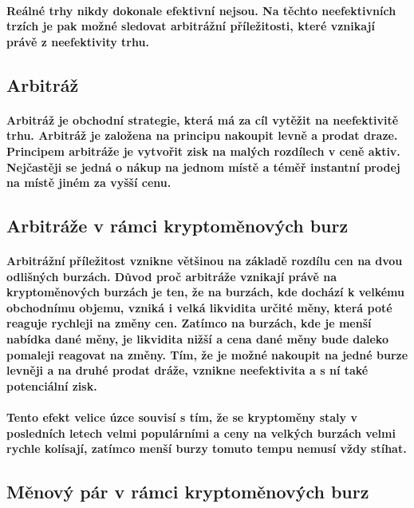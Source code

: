 \documentclass[thesis=B,czech]{FITthesis}[2019/03/21]
\begin{document}
\paragraph{
Reálné trhy nikdy dokonale efektivní nejsou. Na těchto neefektivních trzích je pak možné sledovat arbitrážní příležitosti, které vznikají právě z neefektivity trhu. \cite{what_is_arbitage}
}
\subsection{Arbitráž}
\paragraph{
Arbitráž je obchodní strategie, která má za cíl vytěžit na neefektivitě trhu. Arbitráž je založena na principu nakoupit levně a prodat draze. Principem arbitráže je vytvořit zisk na malých rozdílech v ceně aktiv. Nejčastěji se jedná o nákup na jednom místě a téměř instantní prodej na místě jiném za vyšší cenu. \cite{Capital}
}
\subsection{Arbitráže v rámci kryptoměnových burz}
\paragraph{
Arbitrážní příležitost vznikne většinou na základě rozdílu cen na dvou odlišných burzách. Důvod proč arbitráže vznikají právě na kryptoměnových burzách je ten, že na burzách, kde dochází k velkému obchodnímu objemu, vzniká i velká likvidita určité měny, která poté reaguje rychleji na změny cen. Zatímco na burzách, kde je menší nabídka dané měny, je likvidita nižší a cena dané měny bude daleko pomaleji reagovat na změny. Tím, že je možné nakoupit na jedné burze levněji a na druhé prodat dráže, vznikne neefektivita a s ní také potenciální zisk.
}
\paragraph{
Tento efekt velice úzce souvisí s tím, že se kryptoměny staly v posledních letech velmi populárními a ceny na velkých burzách velmi rychle kolísají, zatímco menší burzy tomuto tempu nemusí vždy stíhat. \cite{finder}
}

\subsection{Měnový pár v rámci kryptoměnových burz}
\end{document}
